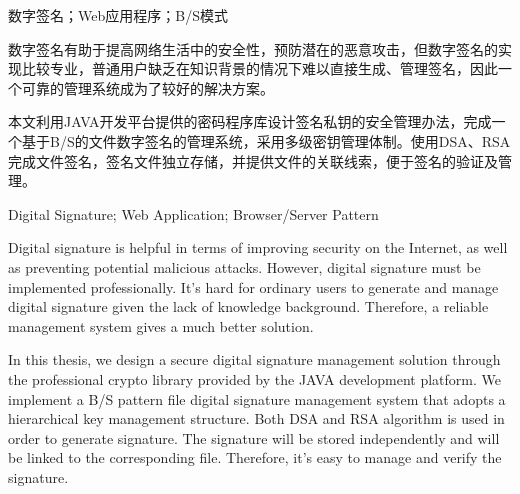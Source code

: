 
\begin{cnabstract}{数字签名；Web应用程序；B/S模式}

	数字签名有助于提高网络生活中的安全性，预防潜在的恶意攻击，但数字签名的实现比较专业，普通用户缺乏在知识背景的情况下难以直接生成、管理签名，因此一个可靠的管理系统成为了较好的解决方案。
	
	本文利用JAVA开发平台提供的密码程序库设计签名私钥的安全管理办法，完成一个基于B/S的文件数字签名的管理系统，采用多级密钥管理体制。使用DSA、RSA完成文件签名，签名文件独立存储，并提供文件的关联线索，便于签名的验证及管理。
\end{cnabstract}


\begin{enabstract}{Digital Signature; Web Application; Browser/Server Pattern}

	Digital signature is helpful in terms of improving security on the Internet, as well as preventing potential malicious attacks. However, digital signature must be implemented professionally. It's hard for ordinary users to generate and manage digital signature given the lack of knowledge background. Therefore, a reliable management system gives a much better solution.
	
	In this thesis, we design a secure digital signature management solution through the professional crypto library provided by the JAVA development platform. We implement a B/S pattern file digital signature management system that adopts a hierarchical key management structure. Both DSA and RSA algorithm is used in order to generate signature. The signature will be stored independently and will be linked to the corresponding file. Therefore, it's easy to manage and verify the signature.
	
\end{enabstract}
